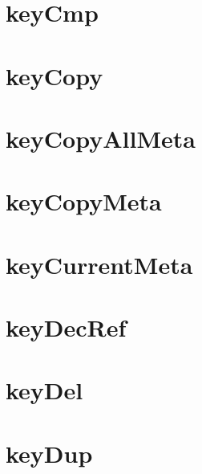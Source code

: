 \let\mypdfximage\pdfximage\def\pdfximage{\immediate\mypdfximage}\documentclass[twoside]{book}
\newcommand{\+}{\discretionary{\mbox{\scriptsize$\hookleftarrow$}}{}{}}
\begin{document}
\chapter{key\+Cmp}
\label{doc_contrib_api_reviews_core_keyCmp_md}

\chapter{key\+Copy}
\label{doc_contrib_api_reviews_core_keyCopy_md}

\chapter{key\+Copy\+All\+Meta}
\label{doc_contrib_api_reviews_core_keyCopyAllMeta_md}

\chapter{key\+Copy\+Meta}
\label{doc_contrib_api_reviews_core_keyCopyMeta_md}

\chapter{key\+Current\+Meta}
\label{doc_contrib_api_reviews_core_keyCurrentMeta_md}

\chapter{key\+Dec\+Ref}
\label{doc_contrib_api_reviews_core_keyDecRef_md}

\chapter{key\+Del}
\label{doc_contrib_api_reviews_core_keyDel_md}

\chapter{key\+Dup}
\label{doc_contrib_api_reviews_core_keyDup_md}

\end{document}
